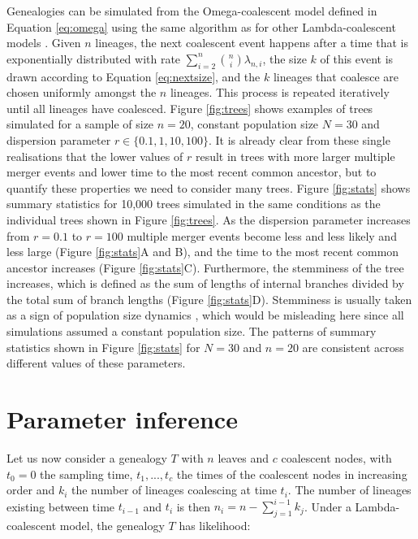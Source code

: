 \documentclass{article}
\renewcommand{\eqref}[1]{\ref{#1}}
\begin{document}
Genealogies can be simulated from the Omega-coalescent model 
defined in Equation \eqref{eq:omega} using the same algorithm
as for other Lambda-coalescent models \citep{pitmanCoalescentsMultipleCollisions1999}.
Given $n$ lineages, the next coalescent event happens after a time that is 
exponentially distributed with rate $\sum_{i=2}^n \binom{n}{i}\lambda_{n,i}$,
the size $k$ of this event is drawn according to Equation \eqref{eq:nextsize},
and the $k$ lineages that coalesce are chosen uniformly amongst the $n$ lineages.
This process is repeated iteratively until all lineages have coalesced.
Figure \ref{fig:trees} shows examples of trees simulated for a sample of size $n=20$,
constant population size $N=30$ and dispersion parameter $r \in \{0.1,1,10,100\}$. 
It is already clear from these single realisations that the lower values of $r$ result
in trees with more larger multiple merger events and lower time to the most recent common ancestor,
but to quantify these properties we need to consider many trees.
Figure \ref{fig:stats} shows summary statistics for 10,000 trees simulated in the same conditions
as the individual trees shown in Figure \ref{fig:trees}. 
As the dispersion parameter increases from $r=0.1$
to $r=100$ multiple merger events become less and less likely and less large
(Figure \ref{fig:stats}A and B), and the 
time to the most recent common ancestor increases
(Figure \ref{fig:stats}C).
Furthermore, the stemminess of the tree increases, 
which is defined as the sum of lengths of internal branches divided by the total sum of branch lengths (Figure \ref{fig:stats}D). 
Stemminess is usually taken as a sign of population size dynamics
\citep{fialaFactorsDeterminingAccuracy1985,Didelot2009d},
which would be misleading here since all simulations assumed
a constant population size. The patterns of summary statistics 
shown in Figure \ref{fig:stats} for $N=30$ and $n=20$ are consistent across different values of these parameters.

\section{Parameter inference}

Let us now consider a genealogy $T$ with $n$ leaves and $c$ coalescent nodes, with $t_0=0$ the
sampling time,
$t_1,...,t_c$ the times of the coalescent nodes in increasing order and $k_i$ the number
of lineages coalescing at time $t_i$. The number of lineages existing between
time $t_{i-1}$ and $t_i$ is then $n_i=n-\sum_{j=1}^{i-1} k_j$.
Under a Lambda-coalescent model, the genealogy $T$ has likelihood:
\end{document}
